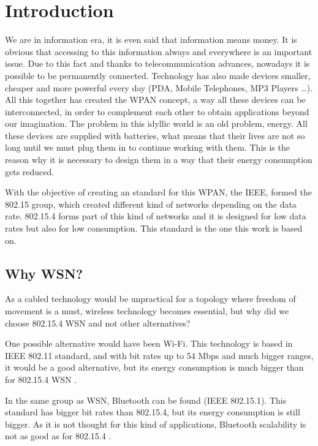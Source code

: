 \chapter{Introduction}
\label{chap:introduction}

We are in information era, it is even said that information means money. It is obvious that accessing to this information
always and everywhere is an important issue. Due to this fact and thanks to telecommunication advances, nowadays it is
possible to be permanently connected. Technology has also made devices smaller, cheaper and more powerful
every day (\ac{PDA}, Mobile Telephones, \ac{MP3} Players \ldots). All this together has created the \ac{WPAN} concept, a way 
all these devices can be interconnected, in order to complement each other to obtain applications beyond our imagination. The 
problem in this idyllic world is an old problem, energy. All these devices are supplied with batteries, what means that their 
lives are not so long until we must plug them in to continue working with them. This is the reason why it is necessary to design them
in a way that their energy consumption gets reduced.

With the objective of creating an standard for this \ac{WPAN}, the \ac{IEEE}, formed the 802.15 group, which created different 
kind of networks depending on the data rate. 802.15.4 forms part of this kind of networks and it is designed for low data rates but 
also for low consumption. This standard is the one this work is based on.

\section{Why \ac{WSN}?}

As a cabled technology would be unpractical for a topology where freedom of movement is a must, wireless technology becomes essential, 
but why did we choose 802.15.4 \ac{WSN} and not other alternatives?

One possible alternative would have been Wi-Fi. This technology is based in \ac{IEEE} 802.11 standard, and with bit rates up to
54 Mbps and much bigger ranges, it would be a good alternative, but its energy consumption is much bigger than for 802.15.4 \ac{WSN} 
\cite{WirelessProtocolsComparison}.

In the same group as \ac{WSN}, Bluetooth can be found (\ac{IEEE} 802.15.1). This standard has bigger bit rates than 
802.15.4, but its energy consumption is still bigger. As it is not thought for this kind of applications, Bluetooth scalability
is not as good as for 802.15.4 \cite{WirelessProtocolsComparison}.

